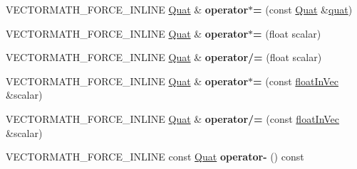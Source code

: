 \begin{DoxyCompactItemize}
\item 
\hypertarget{class_vectormath_1_1_aos_1_1_quat_aa3aeb65a6179f1769433b2b1ef3a3586}{V\+E\+C\+T\+O\+R\+M\+A\+T\+H\+\_\+\+F\+O\+R\+C\+E\+\_\+\+I\+N\+L\+I\+N\+E \hyperlink{class_vectormath_1_1_aos_1_1_quat}{Quat} \& {\bfseries operator$\ast$=} (const \hyperlink{class_vectormath_1_1_aos_1_1_quat}{Quat} \&\hyperlink{classquat}{quat})}\label{class_vectormath_1_1_aos_1_1_quat_aa3aeb65a6179f1769433b2b1ef3a3586}

\item 
\hypertarget{class_vectormath_1_1_aos_1_1_quat_a5022b6c946c23c00c94e35be02301856}{V\+E\+C\+T\+O\+R\+M\+A\+T\+H\+\_\+\+F\+O\+R\+C\+E\+\_\+\+I\+N\+L\+I\+N\+E \hyperlink{class_vectormath_1_1_aos_1_1_quat}{Quat} \& {\bfseries operator$\ast$=} (float scalar)}\label{class_vectormath_1_1_aos_1_1_quat_a5022b6c946c23c00c94e35be02301856}

\item 
\hypertarget{class_vectormath_1_1_aos_1_1_quat_aee82a492d22d88c0a241fe3fbcc4ad16}{V\+E\+C\+T\+O\+R\+M\+A\+T\+H\+\_\+\+F\+O\+R\+C\+E\+\_\+\+I\+N\+L\+I\+N\+E \hyperlink{class_vectormath_1_1_aos_1_1_quat}{Quat} \& {\bfseries operator/=} (float scalar)}\label{class_vectormath_1_1_aos_1_1_quat_aee82a492d22d88c0a241fe3fbcc4ad16}

\item 
\hypertarget{class_vectormath_1_1_aos_1_1_quat_ad2d0ab4553704e04e99661ca959a52ce}{V\+E\+C\+T\+O\+R\+M\+A\+T\+H\+\_\+\+F\+O\+R\+C\+E\+\_\+\+I\+N\+L\+I\+N\+E \hyperlink{class_vectormath_1_1_aos_1_1_quat}{Quat} \& {\bfseries operator$\ast$=} (const \hyperlink{class_vectormath_1_1float_in_vec}{float\+In\+Vec} \&scalar)}\label{class_vectormath_1_1_aos_1_1_quat_ad2d0ab4553704e04e99661ca959a52ce}

\item 
\hypertarget{class_vectormath_1_1_aos_1_1_quat_aaafed68d1c51db881ed54fa3ac349767}{V\+E\+C\+T\+O\+R\+M\+A\+T\+H\+\_\+\+F\+O\+R\+C\+E\+\_\+\+I\+N\+L\+I\+N\+E \hyperlink{class_vectormath_1_1_aos_1_1_quat}{Quat} \& {\bfseries operator/=} (const \hyperlink{class_vectormath_1_1float_in_vec}{float\+In\+Vec} \&scalar)}\label{class_vectormath_1_1_aos_1_1_quat_aaafed68d1c51db881ed54fa3ac349767}

\item 
\hypertarget{class_vectormath_1_1_aos_1_1_quat_ab30a3a221f0a5b6952e90eb28dcdd12a}{V\+E\+C\+T\+O\+R\+M\+A\+T\+H\+\_\+\+F\+O\+R\+C\+E\+\_\+\+I\+N\+L\+I\+N\+E const \hyperlink{class_vectormath_1_1_aos_1_1_quat}{Quat} {\bfseries operator-\/} () const }\label{class_vectormath_1_1_aos_1_1_quat_ab30a3a221f0a5b6952e90eb28dcdd12a}

\end{DoxyCompactItemize}
